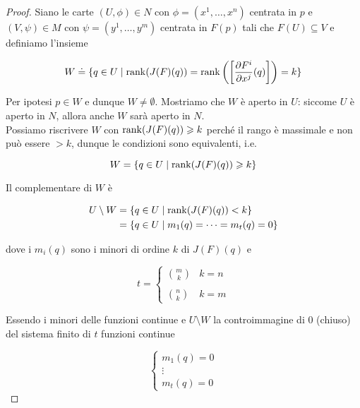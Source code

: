 \begin{proof}
	Siano le carte $ (U,\phi) \in N $ con $ \phi = (x^{1},\dots,x^{n}) $ centrata in $ p $ e $ (V,\psi) \in M $ con $ \psi = (y^{1},\dots,y^{m}) $ centrata in $ F(p) $ tali che $ F(U) \subseteq V $ e definiamo l'insieme
	
	\begin{equation}
		W \doteq \{ q \in U \mid \rank(J(F)(q)) = \rank \left( \left[ \dfrac{\partial F^{i}}{\partial x^{j}} (q) \right] \right) = k \}
	\end{equation}

	Per ipotesi $ p \in W $ e dunque $ W \neq \emptyset $. Mostriamo che $ W $ è aperto in $ U $: siccome $ U $ è aperto in $ N $, allora anche $ W $ sarà aperto in $ N $.\\
	Possiamo riscrivere $ W $ con $ \rank(J(F)(q)) \geqslant k $ perché il rango è massimale e non può essere $ >k $, dunque le condizioni sono equivalenti, i.e.
	
	\begin{equation}
		W = \{ q \in U \mid \rank(J(F)(q)) \geqslant k \}
	\end{equation}

	Il complementare di $ W $ è
	
	\begin{align}
		\begin{split}
			U \setminus W &= \{ q \in U \mid \rank(J(F)(q)) < k \}\\
			&= \{ q \in U \mid m_{1}(q) = \cdots = m_{t}(q) = 0 \}
		\end{split}
	\end{align}

	dove i $ m_{i}(q) $ sono i minori di ordine $ k $ di $ J(F)(q) $ e
	
	\begin{equation}
		t =%
			\begin{cases}
				\binom{m}{k} & k = n\\\\
				\binom{n}{k} & k = m
			\end{cases}
	\end{equation}

	Essendo i minori delle funzioni continue e $ U \setminus W $ la controimmagine di 0 (chiuso) del sistema finito di $ t $ funzioni continue
	
	\begin{equation}
		\begin{cases}
			m_{1}(q) = 0\\
			\vdots\\
			m_{t}(q) = 0
		\end{cases}
	\end{equation}


\end{proof}
